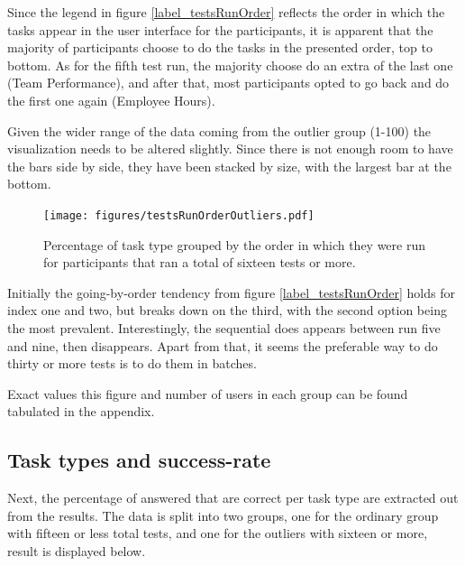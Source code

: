 \documentclass[nofilelist,dvipsnames]{cslthse-msc}
\begin{document}
        Since the legend in figure \ref{label_testsRunOrder} reflects the order in which the
        tasks appear in the user interface for the participants, it is apparent
        that the majority of participants choose to do the tasks in the
        presented order, top to bottom. As for the fifth test run, the majority
        choose do an extra of the last one (Team Performance), and after that,
        most participants opted to go back and do the first one again (Employee
        Hours).

        \newpage
        Given the wider range of the data coming from the outlier group (1-100)
        the visualization needs to be altered slightly. Since there is not
        enough room to have the bars side by side, they have been stacked by
        size, with the largest bar at the bottom.
				\begin{figure}[ht!]
					\centering
					\texttt{[image: figures/testsRunOrderOutliers.pdf]}
          \caption{
            Percentage of task type grouped by the order in which they were
            run for participants that ran a total of sixteen tests or more.
          }
				\end{figure}

        Initially the going-by-order tendency from figure \ref{label_testsRunOrder}
        holds for index one and two, but breaks down on the third, with the
        second option being the most prevalent. Interestingly, the sequential
        does appears between run five and nine, then disappears. Apart from
        that, it seems the preferable way to do thirty or more tests is to do
        them in batches.

        Exact values this figure and number of users in each group can be found
        tabulated in the appendix. 

%
      \newpage
      \subsection{Task types and success-rate}

        Next, the percentage of answered that are correct per task type are
        extracted out from the results. The data is split into two groups, one
        for the ordinary group with fifteen or less total tests, and one for
        the outliers with sixteen or more, result is displayed below.
\end{document}
